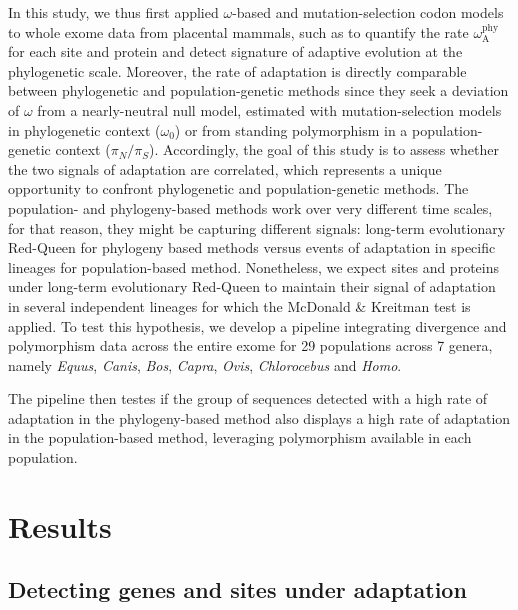 \documentclass{article}
\newcommand{\pn}{\pi_N}
\newcommand{\ps}{\pi_S}
\newcommand{\pnps}{\pn / \ps}
\begin{document}
    In this study, we thus first applied $\omega$-based and mutation-selection codon models to whole exome data from placental mammals, such as to quantify the rate $\omega_{\mathrm{A}}^{\mathrm{phy}}$ for each site and protein and detect signature of adaptive evolution at the phylogenetic scale.
    Moreover, the rate of adaptation is directly comparable between phylogenetic and population-genetic methods since they seek a deviation of $\omega$ from a nearly-neutral null model, estimated with mutation-selection models in phylogenetic context ($\omega_{0}$) or from standing polymorphism in a population-genetic context ($\pnps$).
    Accordingly, the goal of this study is to assess whether the two signals of adaptation are correlated, which represents a unique opportunity to confront phylogenetic and population-genetic methods.
    The population- and phylogeny-based methods work over very different time scales, for that reason, they might be capturing different signals: long-term evolutionary Red-Queen for phylogeny based methods versus events of adaptation in specific lineages for population-based method.
    Nonetheless, we expect sites and proteins under long-term evolutionary Red-Queen to maintain their signal of adaptation in several independent lineages for which the McDonald \& Kreitman test is applied.
    To test this hypothesis, we develop a pipeline integrating divergence and polymorphism data across the entire exome for 29 populations across 7 genera, namely \textit{Equus}, \textit{Canis}, \textit{Bos}, \textit{Capra}, \textit{Ovis}, \textit{Chlorocebus} and \textit{Homo}.

    The pipeline then testes if the group of sequences detected with a high rate of adaptation in the phylogeny-based method also displays a high rate of adaptation in the population-based method, leveraging polymorphism available in each population.

    \section*{Results}\label{sec:results}

    \subsection*{Detecting genes and sites under adaptation}
\end{document}
